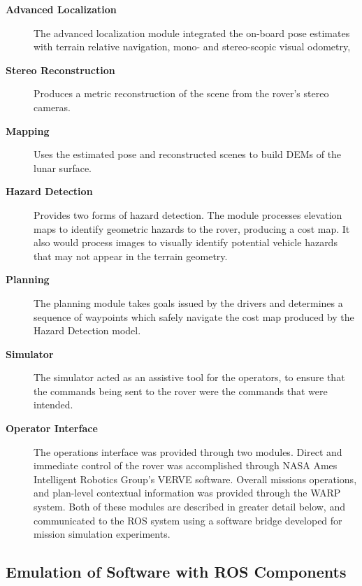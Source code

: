 \documentclass[twocolumn,letterpaper]{IEEEAerospaceCLS}  %
\begin{document}
\begin{description}
\item[\textbf{Advanced Localization}]  The advanced localization module integrated the on-board pose estimates with terrain relative navigation, mono- and stereo-scopic visual odometry, 
\item[\textbf{Stereo Reconstruction}] Produces a metric reconstruction of the scene from the rover's stereo cameras.
\item[\textbf{Mapping}] Uses the estimated pose and reconstructed scenes to build DEMs of the lunar surface.  
\item[\textbf{Hazard Detection}] Provides two forms of hazard detection.  The module processes elevation maps to identify geometric hazards to the rover, producing a cost map.  It also would process images to visually identify potential vehicle hazards that may not appear in the terrain geometry.
\item[\textbf{Planning}]  The planning module takes goals issued by the drivers and determines a sequence of waypoints which safely navigate the cost map produced by the Hazard Detection model.  
\item[\textbf{Simulator}]  The simulator acted as an assistive tool for the operators, to ensure that the commands being sent to the rover were the commands that were intended.  
\item[\textbf{Operator Interface}]  The operations interface was provided through two modules.  Direct and immediate control of the rover was accomplished through NASA Ames Intelligent Robotics Group's VERVE software.  Overall missions operations, and plan-level contextual information was provided through the WARP system.  Both of these modules are described in greater detail below, and communicated to the ROS system using a software bridge developed for mission simulation experiments.
\end{description}

\subsection{Emulation of Software with ROS Components}
\end{document}
